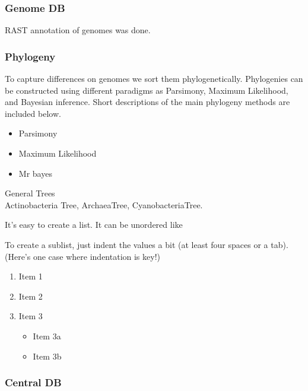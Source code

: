 \documentclass[12pt,twoside]{reedthesis}
\providecommand{\tightlist}{%
  \setlength{\itemsep}{0pt}\setlength{\parskip}{0pt}}
\begin{document}
  \subsubsection{Genome DB}\label{genome-db}
  
  RAST annotation of genomes was done.
  
  \subsubsection{Phylogeny}\label{phylogeny}
  
  To capture differences on genomes we sort them phylogenetically.
  Phylogenies can be constructed using different paradigms as Parsimony,
  Maximum Likelihood, and Bayesian inference. Short descriptions of the
  main phylogeny methods are included below.
  
  \begin{itemize}
  \tightlist
  \item
    Parsimony
  \item
    Maximum Likelihood
  \item
    Mr bayes
  \end{itemize}
  
  General Trees\\
  Actinobacteria Tree, ArchaeaTree, CyanobacteriaTree.
  
  It's easy to create a list. It can be unordered like
  
  To create a sublist, just indent the values a bit (at least four spaces
  or a tab). (Here's one case where indentation is key!)
  
  \begin{enumerate}
  \def\labelenumi{\arabic{enumi}.}
  \tightlist
  \item
    Item 1
  \item
    Item 2
  \item
    Item 3
  
    \begin{itemize}
    \tightlist
    \item
      Item 3a
    \item
      Item 3b
    \end{itemize}
  \end{enumerate}
  
  \subsubsection{Central DB}\label{central-db}
  
\end{document}

